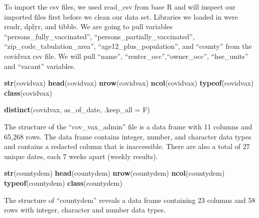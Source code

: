 \documentclass[
]{article}
\newenvironment{Shaded}{\begin{snugshade}}{\end{snugshade}}
\newcommand{\DataTypeTok}[1]{\textcolor[rgb]{0.13,0.29,0.53}{#1}}
\newcommand{\KeywordTok}[1]{\textcolor[rgb]{0.13,0.29,0.53}{\textbf{#1}}}
\newcommand{\NormalTok}[1]{#1}
\begin{document}
To import the csv files, we used read\_csv from base R and will inspect
our imported files first before we clean our data set. Libraries we
loaded in were readr, dplyr, and tibble. We are going to pull variables
``persons\_fully\_vaccinated'', ``persons\_partially\_vaccinated'',
``zip\_code\_tabulation\_area'', ``age12\_plus\_population'', and
``county'' from the covidvax csv file. We will pull ``name'',
``renter\_occ'',``owner\_occ'', ``hse\_units'' and ``vacant'' variables.

\begin{Shaded}
\begin{Highlighting}[]
\KeywordTok{str}\NormalTok{(covidvax)}
\KeywordTok{head}\NormalTok{(covidvax)}
\KeywordTok{nrow}\NormalTok{(covidvax)}
\KeywordTok{ncol}\NormalTok{(covidvax)}
\KeywordTok{typeof}\NormalTok{(covidvax)}
\KeywordTok{class}\NormalTok{(covidvax)}
\end{Highlighting}
\end{Shaded}

\begin{Shaded}
\begin{Highlighting}[]
\KeywordTok{distinct}\NormalTok{(covidvax, as_of_date, }\DataTypeTok{.keep_all =}\NormalTok{ F)}
\end{Highlighting}
\end{Shaded}

The structure of the ``cov\_vax\_admin'' file is a data frame with 11
columns and 65,268 rows. The data frame contains integer, number, and
character data types and contains a redacted column that is
inaccessible. There are also a total of 27 unique dates, each 7 weeks
apart (weekly results).

\begin{Shaded}
\begin{Highlighting}[]
\KeywordTok{str}\NormalTok{(countydem)}
\KeywordTok{head}\NormalTok{(countydem)}
\KeywordTok{nrow}\NormalTok{(countydem)}
\KeywordTok{ncol}\NormalTok{(countydem)}
\KeywordTok{typeof}\NormalTok{(countydem)}
\KeywordTok{class}\NormalTok{(countydem)}
\end{Highlighting}
\end{Shaded}

The structure of ``countydem'' reveals a data frame containing 23
columns and 58 rows with integer, character and number data types.

\newpage
\end{document}

